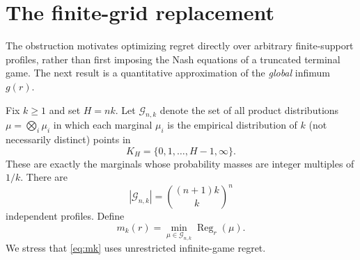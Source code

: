 \documentclass[11pt,a4paper]{article}
\numberwithin{equation}{section}
\theoremstyle{plain}
\theoremstyle{definition}
\theoremstyle{remark}
\newcommand{\Reg}{\operatorname{Reg}}
\begin{document}
\section{The finite-grid replacement}\label{sec:finite-grid}
The obstruction motivates optimizing regret directly over arbitrary
finite-support profiles, rather than first imposing the Nash equations
of a truncated terminal game. The next result is a quantitative
approximation of the \emph{global} infimum $g(r)$.

Fix $k\ge1$ and set $H=nk$. Let $\mathcal G_{n,k}$ denote the set of
all product distributions $\mu=\bigotimes_i\mu_i$ in which each marginal
$\mu_i$ is the empirical distribution of $k$ (not necessarily distinct)
points in
\begin{equation}\label{eq:grid-space}
 K_H=\{0,1,\ldots,H-1,\infty\}.
\end{equation}
These are exactly the marginals whose probability masses are integer
multiples of $1/k$. There are
\begin{equation}\label{eq:gridcount}
 |\mathcal G_{n,k}|=\binom{(n+1)k}{k}^{n}
\end{equation}
independent profiles. Define
\begin{equation}\label{eq:mk}
 m_k(r)=\min_{\mu\in\mathcal G_{n,k}}\Reg_r(\mu).
\end{equation}
We stress that \eqref{eq:mk} uses unrestricted infinite-game regret.
\end{document}
